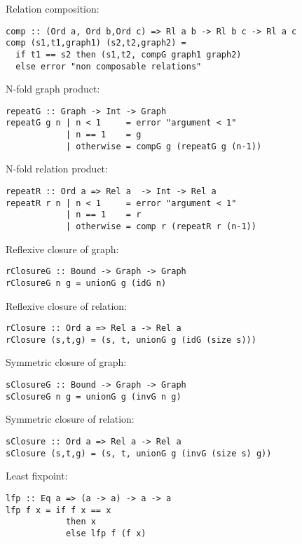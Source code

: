 Relation composition: 

\bc\begin{verbatim}
comp :: (Ord a, Ord b,Ord c) => Rl a b -> Rl b c -> Rl a c 
comp (s1,t1,graph1) (s2,t2,graph2) = 
  if t1 == s2 then (s1,t2, compG graph1 graph2)
  else error "non composable relations"
\end{verbatim}\ec

N-fold graph product: 

\bc\begin{verbatim}
repeatG :: Graph -> Int -> Graph 
repeatG g n | n < 1     = error "argument < 1"
            | n == 1    = g 
            | otherwise = compG g (repeatG g (n-1))
\end{verbatim}\ec

N-fold relation product: 

\bc\begin{verbatim}
repeatR :: Ord a => Rel a  -> Int -> Rel a
repeatR r n | n < 1     = error "argument < 1"
            | n == 1    = r
            | otherwise = comp r (repeatR r (n-1))
\end{verbatim}\ec

Reflexive closure of graph: 

\bc\begin{verbatim}
rClosureG :: Bound -> Graph -> Graph
rClosureG n g = unionG g (idG n)
\end{verbatim}\ec

Reflexive closure of relation: 

\bc\begin{verbatim}
rClosure :: Ord a => Rel a -> Rel a 
rClosure (s,t,g) = (s, t, unionG g (idG (size s)))
\end{verbatim}\ec

Symmetric closure of graph: 

\bc\begin{verbatim} 
sClosureG :: Bound -> Graph -> Graph 
sClosureG n g = unionG g (invG n g)
\end{verbatim}\ec

Symmetric closure of relation: 

\bc\begin{verbatim} 
sClosure :: Ord a => Rel a -> Rel a
sClosure (s,t,g) = (s, t, unionG g (invG (size s) g))
\end{verbatim}\ec

Least fixpoint: 

\bc\begin{verbatim} 
lfp :: Eq a => (a -> a) -> a -> a
lfp f x = if f x == x  
            then x
            else lfp f (f x) 
\end{verbatim}\ec  

